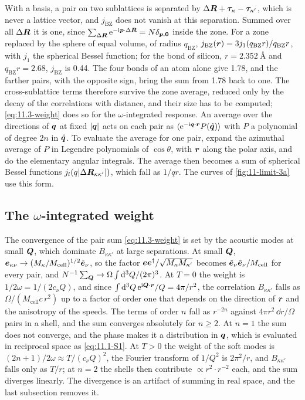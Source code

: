 With a basis, a pair on two sublattices is separated by $\Delta\bm{R} + \bm{\tau}_\kappa - \bm{\tau}_{\kappa'}$, which is never a lattice vector, and $j_{\mathrm{BZ}}$ does not vanish at this separation. Summed over all $\Delta\bm{R}$ it is one, since $\sum_{\Delta\bm{R}}\mathrm{e}^{-\mathrm{i}\bm{p}\cdot\Delta\bm{R}} = N\delta_{\bm{p},\bm{0}}$ inside the zone. For a zone replaced by the sphere of equal volume, of radius $q_{\mathrm{BZ}}$, $j_{\mathrm{BZ}}(\bm{r}) = 3j_1(q_{\mathrm{BZ}}r)/q_{\mathrm{BZ}}r$, with $j_1$ the spherical Bessel function; for the bond of silicon, $r = \SI{2.352}{\angstrom}$ and $q_{\mathrm{BZ}}r = 2.68$, $j_{\mathrm{BZ}}$ is 0.44. The four bonds of an atom alone give 1.78, and the farther pairs, with the opposite sign, bring the sum from 1.78 back to one. The cross-sublattice terms therefore survive the zone average, reduced only by the decay of the correlations with distance, and their size has to be computed; \cref{eq:11.3-weight} does so for the $\omega$-integrated response. An average over the directions of $\bm{q}$ at fixed $|\bm{q}|$ acts on each pair as $\langle\mathrm{e}^{-\mathrm{i}\bm{q}\cdot\bm{r}}P(\hat{\bm{q}})\rangle$ with $P$ a polynomial of degree $2n$ in $\hat{\bm{q}}$. To evaluate the average for one pair, expand the azimuthal average of $P$ in Legendre polynomials of $\cos\theta$, with $\bm{r}$ along the polar axis, and do the elementary angular integrals. The average then becomes a sum of spherical Bessel functions $j_l(q|\Delta\bm{R}_{\kappa\kappa'}|)$, which fall as $1/qr$. The curves of \cref{fig:11-limit-3a} use this form.

\subsection{The $\omega$-integrated weight}

The convergence of the pair sum \cref{eq:11.3-weight} is set by the acoustic modes at small $\bm{Q}$, which dominate $B_{\kappa\kappa'}$ at large separations. At small $\bm{Q}$, $\bm{e}_{\kappa\nu} \to (M_\kappa/M_{\mathrm{cell}})^{1/2}\hat{\bm{e}}_\nu$, so the factor $\bm{e}\bm{e}^\dagger/\sqrt{M_\kappa M_{\kappa'}}$ becomes $\hat{\bm{e}}_\nu\hat{\bm{e}}_\nu/M_{\mathrm{cell}}$ for every pair, and $N^{-1}\sum_{\bm{Q}} \to \Omega\int\mathrm{d}^3Q/(2\pi)^3$. At $T = 0$ the weight is $1/2\omega = 1/(2c_\nu Q)$, and since $\int\mathrm{d}^3Q\,\mathrm{e}^{\mathrm{i}\bm{Q}\cdot\bm{r}}/Q = 4\pi/r^2$, the correlation $B_{\kappa\kappa'}$ falls as $\Omega/(M_{\mathrm{cell}}c\,r^2)$ up to a factor of order one that depends on the direction of $\bm{r}$ and the anisotropy of the speeds. The terms of order $n$ fall as $r^{-2n}$ against $4\pi r^2\,\dd r/\Omega$ pairs in a shell, and the sum converges absolutely for $n \ge 2$. At $n = 1$ the sum does not converge, and the phase makes it a distribution in $\bm{q}$, which is evaluated in reciprocal space as \cref{eq:11.1-S1}. At $T > 0$ the weight of the soft modes is $(2n + 1)/2\omega \approx T/(c_\nu Q)^2$, the Fourier transform of $1/Q^2$ is $2\pi^2/r$, and $B_{\kappa\kappa'}$ falls only as $T/r$; at $n = 2$ the shells then contribute $\propto r^2\cdot r^{-2}$ each, and the sum diverges linearly. The divergence is an artifact of summing in real space, and the last subsection removes it.

